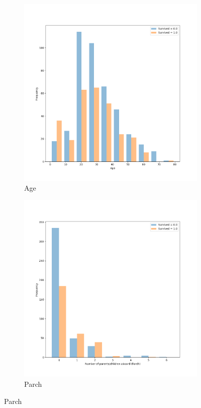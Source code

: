 \documentclass[11pt]{article}
\begin{document}
\begin{itemize}
\begin{enumerate}
\begin{figure}
\begin{subfigure}[b]{0.49\textwidth}
          \includegraphics[width=\textwidth]{figs/age.png}
          \caption{Age}
        \end{subfigure}
        \begin{subfigure}[b]{0.49\textwidth}
          \includegraphics[width=\textwidth]{figs/parch.png}
          \caption{Parch}
        \end{subfigure}


\end{figure}
\end{enumerate}
\end{itemize}
\end{document}

